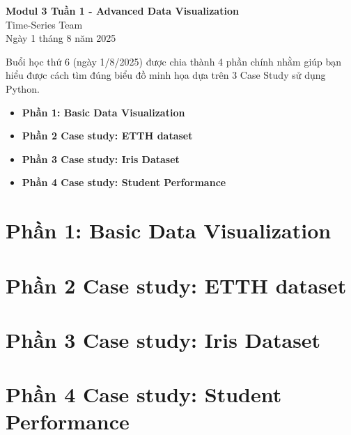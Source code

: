 \documentclass[11pt]{article}
\renewcommand{\maketitle}{%
    \begin{center}
        \fontsize{18}{20}\selectfont\textbf{Modul 3 Tuần 1 - Advanced Data Visualization}\\[1em]
        \fontsize{14}{16}\selectfont Time-Series Team\\[0.5em]
        \fontsize{14}{16}\selectfont Ngày 1 tháng 8 năm 2025
    \end{center}
    \vspace{1.5em} %
}
\begin{document}
\maketitle %

\begin{summarybox}
	Buổi học thứ 6 (ngày 1/8/2025) được chia thành 4 phần chính nhằm giúp bạn hiểu được cách tìm đúng biểu đồ minh họa dựa trên 3 Case Study sử dụng Python.
    \begin{itemize}
        \item \textbf{Phần 1: Basic Data Visualization}
        \item \textbf{Phần 2 Case study: ETTH dataset}
        \item \textbf{Phần 3 Case study: Iris Dataset}
        \item \textbf{Phần 4 Case study: Student Performance}
    \end{itemize}
\end{summarybox}

\section{Phần 1: Basic Data Visualization}
\section{Phần 2 Case study: ETTH dataset}
\section{Phần 3 Case study: Iris Dataset}
\section{Phần 4 Case study: Student Performance}
\end{document}
